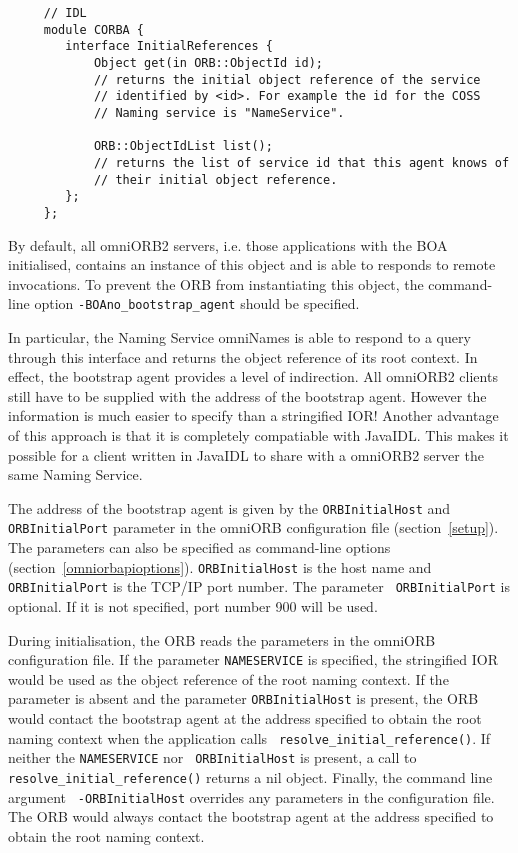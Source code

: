 \documentclass[11pt,twoside,onecolumn]{book}
\begin{document}
{
\small
\begin{verbatim}
     // IDL
     module CORBA {
        interface InitialReferences {
            Object get(in ORB::ObjectId id);
            // returns the initial object reference of the service
            // identified by <id>. For example the id for the COSS
            // Naming service is "NameService".

            ORB::ObjectIdList list();
            // returns the list of service id that this agent knows of
            // their initial object reference.
        };
     };
\end{verbatim}
}

By default, all omniORB2 servers, i.e. those applications with the BOA
initialised, contains an instance of this object and is able to responds to
remote invocations. To prevent the ORB from instantiating this object, the
command-line option {\tt -BOAno\_bootstrap\_agent} should be specified.

In particular, the Naming Service omniNames is able to respond to a query
through this interface and returns the object reference of its root
context. In effect, the bootstrap agent provides a level of indirection.
All omniORB2 clients still have to be supplied with the address of the
bootstrap agent. However the information is much easier to specify than a
stringified IOR! Another advantage of this approach is that it is
completely compatiable with JavaIDL. This makes it possible for a client
written in JavaIDL to share with a omniORB2 server the same Naming Service.

The address of the bootstrap agent is given by the {\tt ORBInitialHost} and
{\tt ORBInitialPort} parameter in the omniORB configuration file
(section~\ref{setup}). The parameters can also be specified as command-line
options (section~\ref{omniorbapioptions}). {\tt ORBInitialHost} is the host
name and {\tt ORBInitialPort} is the TCP/IP port number. The parameter {\tt
ORBInitialPort} is optional. If it is not specified, port number 900 will
be used. 

During initialisation, the ORB reads the parameters in the omniORB
configuration file. If the parameter {\tt NAMESERVICE} is specified, the
stringified IOR would be used as the object reference of the root naming
context. If the parameter is absent and the parameter {\tt ORBInitialHost}
is present, the ORB would contact the bootstrap agent at the address
specified to obtain the root naming context when the application calls {\tt
resolve\_initial\_reference()}. If neither the {\tt NAMESERVICE} nor {\tt
ORBInitialHost} is present, a call to {\tt resolve\_initial\_reference()}
returns a nil object. Finally, the command line argument {\tt
-ORBInitialHost} overrides any parameters in the configuration file. The
ORB would always contact the bootstrap agent at the address specified to
obtain the root naming context.
\end{document}
